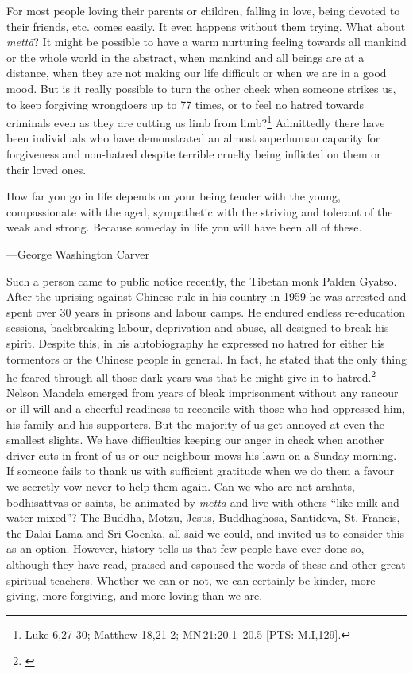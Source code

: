 \documentclass[10pt, openright]{book}
\newenvironment{epigram-2}%
{%
\vspace{1em}
\noindent
\quoting[leftmargin=2.5cm,rightmargin=2.5cm]%
\begin{itshape}
\large
}%
{\end{itshape}\endquoting
}%
\newenvironment{epigram-2-cite}%
{%
\quoting[leftmargin=2.5cm,rightmargin=2.5cm]%
\noindent\normal\hspace*{\fill} 
}%
{\endquoting\vspace{1em}
}%
\begin{document}
For most people loving their parents or children, falling in love, being devoted to their friends, etc. comes easily. It even happens without them trying. What about \textit{mettā}? It might be possible to have a warm nurturing feeling towards all mankind or the whole world in the abstract, when mankind and all beings are at a distance, when they are not making our life difficult or when we are in a good mood. But is it really possible to turn the other cheek when someone strikes us, to keep forgiving wrongdoers up to 77 times, or to feel no hatred towards criminals even as they are cutting us limb from limb?\footnote {Luke 6,27-30; Matthew 18,21-2; \href{https://suttacentral.net/mn21/en/sujato\#20.1}{MN 21:20.1–20.5} [PTS: M.I,129].} Admittedly there have been individuals who have demonstrated an almost superhuman capacity for forgiveness and non-hatred despite terrible cruelty being inflicted on them or their loved ones.


\begin{epigram-2}
How far you go in life depends on your being tender with the young, compassionate with the aged, sympathetic with the striving and tolerant of the weak and strong. Because someday in life you will have been all of these.
\end{epigram-2}

\begin{epigram-2-cite}
—George Washington Carver
\end{epigram-2-cite}

Such a person came to public notice recently, the Tibetan monk Palden Gyatso. After the uprising against Chinese rule in his country in 1959 he was arrested and spent over 30 years in prisons and labour camps. He endured endless re-education sessions, backbreaking labour, deprivation and abuse, all designed to break his spirit. Despite this, in his autobiography he expressed no hatred for either his tormentors or the Chinese people in general. In fact, he stated that the only thing he feared through all those dark years was that he might give in to hatred.\footnote {\cite{Palden 1997}} Nelson Mandela emerged from years of bleak imprisonment without any rancour or ill-will and a cheerful readiness to reconcile with those who had oppressed him, his family and his supporters. But the majority of us get annoyed at even the smallest slights. We have difficulties keeping our anger in check when another driver cuts in front of us or our neighbour mows his lawn on a Sunday morning. If someone fails to thank us with sufficient gratitude when we do them a favour we secretly vow never to help them again. Can we who are not arahats, bodhisattvas or saints, be animated by \textit{mettā} and live with others “like milk and water mixed”? The Buddha, Motzu, Jesus, Buddhaghosa, Santideva, St. Francis, the Dalai Lama and Sri Goenka, all said we could, and invited us to consider this as an option. However, history tells us that few people have ever done so, although they have read, praised and espoused the words of these and other great spiritual teachers. Whether we can or not, we can certainly be kinder, more giving, more forgiving, and more loving than we are.
\end{document}

